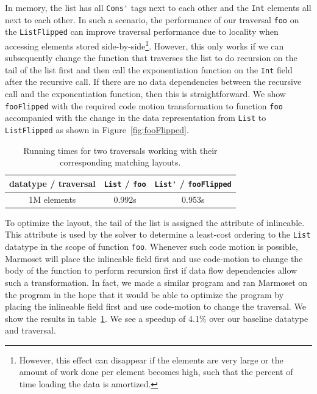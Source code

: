 \documentclass[acmsmall,review,anonymous]{acmart}\settopmatter{printfolios=true,printccs=false,printacmref=false}
\newcommand{\new}[1]{{\color{very-dark-green}{#1}}}
\newcommand{\new}[1]{#1}
\newcommand{\system}{{\sc Marmoset}\xspace}
\begin{document}
In memory, the list has all \lstinline|Cons'| tags next to each other \new{(a unary encoding of array length!)} and the \lstinline|Int| elements all next to each other.
In such a scenario, the performance of our traversal \lstinline|foo| on the \lstinline|ListFlipped| can improve 
traversal performance due to locality when accessing elements stored side-by-side\footnote{However, this effect can disappear if the elements are very large or the amount of work done per element becomes high, such that the percent of time loading the data is amortized.}.
However, this only works if we
can subsequently change the function that traverses the list to do recursion on the tail of the list first and then call the exponentiation
function on the \lstinline|Int| field after the recursive call. If there are no data dependencies between the recursive call and the exponentiation
function, then this is straightforward. We show \lstinline|fooFlipped| with the required code motion transformation to function \lstinline|foo| accompanied
with the change in the data representation from \lstinline|List| to \lstinline|ListFlipped| as shown in Figure~\ref{fig:fooFlipped}.




				




\begin{table}[]
	\caption{Running times for two traversals working with their corresponding matching layouts.}
	\begin{tabular}{ccc}
	\toprule
	datatype / traversal & \lstinline|List| / \lstinline|foo| & \lstinline|List'| / \lstinline|fooFlipped| \\
	\midrule
    {1M elements} & 0.992s & 0.953s \\
	\bottomrule
	\end{tabular}
	\label{table:list-power}
\end{table}

To optimize the layout, the tail of the list is assigned the attribute of inlineable. This attribute is used by the solver to
determine a least-cost ordering to the \lstinline|List| datatype in the scope of function \lstinline|foo|. 
Whenever such code motion is possible, \system will place the inlineable field first and use code-motion to change
the body of the function to perform recursion first if data flow dependencies allow such a transformation. In fact, we made a 
similar program and ran \system on the program in the hope that it would be able to optimize the program by placing the inlineable
field first and use code-motion to change the traversal. We show the results in table~\ref{table:list-power}. We see a speedup of 4.1\% 
over our baseline datatype and traversal.
\end{document}
